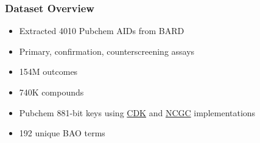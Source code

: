 \documentclass[anchorcolor=blue,linkcolor=blue]{beamer}
\begin{document}
\begin{frame}
  \frametitle{Dataset Overview}
  \begin{itemize}
  \item Extracted 4010 Pubchem AIDs from BARD
  \item Primary, confirmation, counterscreening assays
  \item 154M outcomes
  \item 740K compounds
  \item Pubchem 881-bit keys using \href{http://cdk.github.io/cdk/1.5/docs/api/org/openscience/cdk/fingerprint/PubchemFingerprinter.html}{CDK} and
    \href{https://bitbucket.org/caodac/pcfp}{NCGC} implementations  
  \item 192 unique BAO terms  
  \end{itemize}
\end{frame}
\end{document}
